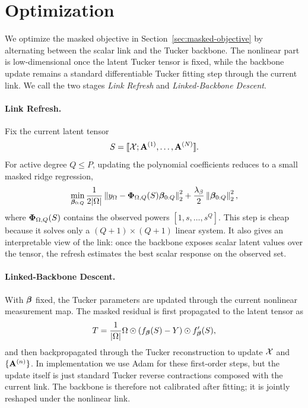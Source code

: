 \section{Optimization}
\label{sec:optimization}

We optimize the masked objective in Section~\ref{sec:masked-objective} by
alternating between the scalar link and the Tucker backbone. The nonlinear part
is low-dimensional once the latent Tucker tensor is fixed, while the backbone
update remains a standard differentiable Tucker fitting step through the
current link. We call the two stages \emph{Link Refresh} and
\emph{Linked-Backbone Descent}.

\paragraph{Link Refresh.}
Fix the current latent tensor
\begin{equation}
  S=\llbracket \mathcal{X}; \mathbf{A}^{(1)},\ldots,\mathbf{A}^{(N)} \rrbracket.
\end{equation}
For active degree \(Q\le P\), updating the polynomial coefficients reduces to
a small masked ridge regression,
\begin{equation}
  \min_{\boldsymbol{\beta}_{0:Q}}
  \frac{1}{2|\Omega|}
  \left\lVert y_\Omega-\boldsymbol{\Phi}_{\Omega,Q}(S)\boldsymbol{\beta}_{0:Q} \right\rVert_2^2
  +
  \frac{\lambda_\beta}{2}\left\lVert \boldsymbol{\beta}_{0:Q} \right\rVert_2^2,
  \label{eq:main-beta-subproblem}
\end{equation}
where \(\boldsymbol{\Phi}_{\Omega,Q}(S)\) contains the observed powers
\([1,s,\ldots,s^Q]\). This step is cheap because it solves only a
\((Q+1)\times(Q+1)\) linear system. It also gives an interpretable view of the
link: once the backbone exposes scalar latent values over the tensor, the
refresh estimates the best scalar response on the observed set.

\paragraph{Linked-Backbone Descent.}
With \(\boldsymbol{\beta}\) fixed, the Tucker parameters are updated through the current
nonlinear measurement map. The masked residual is first propagated to the
latent tensor as
\begin{equation}
  T=
  \frac{1}{|\Omega|}
  \Omega\odot\left(f_{\boldsymbol{\beta}}(S)-Y\right)\odot f'_{\boldsymbol{\beta}}(S),
\end{equation}
and then backpropagated through the Tucker reconstruction to update
\(\mathcal{X}\) and \(\{\mathbf{A}^{(n)}\}\). In implementation we use Adam for these
first-order steps, but the update itself is just standard Tucker reverse
contractions composed with the current link. The backbone is therefore not
calibrated after fitting; it is jointly reshaped under the nonlinear
link.

